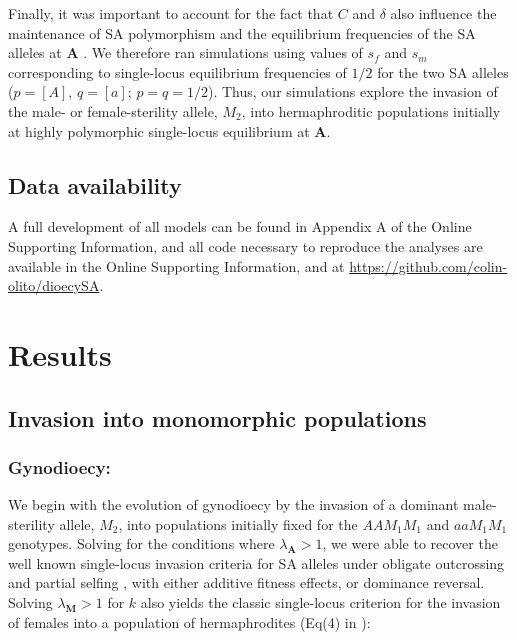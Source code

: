 \documentclass[9pt,twocolumn,twoside,lineno]{gsajnl}
\begin{document}
Finally, it was important to account for the fact that $C$ and $\delta$ also influence the maintenance of SA polymorphism and the equilibrium frequencies of the SA alleles at $\mathbf{A}$ \citep{JordanConnallon2014,Olito2017}. We therefore ran simulations using values of $s_f$ and $s_m$ corresponding to single-locus equilibrium frequencies of $1/2$ for the two SA alleles ($p = [A]$, $q = [a]$; $p=q=1/2$). Thus, our simulations explore the invasion of the male- or female-sterility allele, $M_2$, into hermaphroditic populations initially at highly polymorphic single-locus equilibrium at $\mathbf{A}$.


\subsection{Data availability}
A full development of all models can be found in Appendix A of the Online Supporting Information, and all code necessary to reproduce the analyses are available in the Online Supporting Information, and at \url{https://github.com/colin-olito/dioecySA}.

\section{Results}

\subsection{Invasion into monomorphic populations}

\subsubsection{Gynodioecy:} We begin with the evolution of gynodioecy by the invasion of a dominant male-sterility allele, $M_2$, into populations initially fixed for the $AAM_1M_1$ and $aaM_1M_1$ genotypes. Solving for the conditions where $\lambda_{\mathbf{A}} > 1$, we were able to recover the well known single-locus invasion criteria for SA alleles under obligate outcrossing \citep{Kidwell1977} and partial selfing \citep{JordanConnallon2014,Olito2017}, with either additive fitness effects, or dominance reversal. Solving $\lambda_{\mathbf{M}} > 1$ for $k$ also yields the classic single-locus criterion for the invasion of females into a population of hermaphrodites (Eq(4) in \citealt{Charlesworth1978a}):
\end{document}
